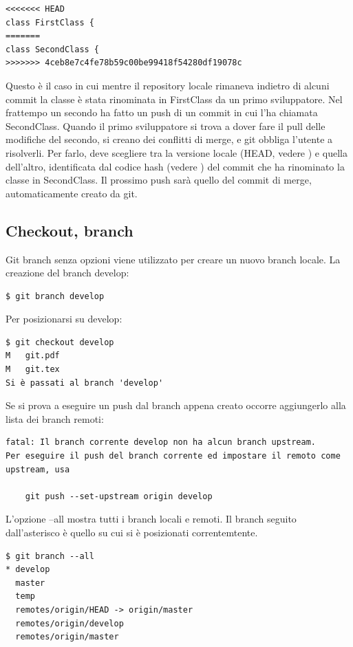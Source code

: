 \documentclass{article}
\begin{document}
\begin{verbatim}
<<<<<<< HEAD
class FirstClass {
=======
class SecondClass {
>>>>>>> 4ceb8e7c4fe78b59c00be99418f54280df19078c
\end{verbatim}

Questo è il caso in cui mentre il repository locale rimaneva indietro di alcuni
commit la classe è stata rinominata in FirstClass da un primo sviluppatore. Nel
frattempo un secondo ha fatto un push di un commit in cui l'ha chiamata
SecondClass. Quando il primo sviluppatore si trova a dover fare il pull delle modifiche del
secondo, si creano dei conflitti di merge, e git obbliga l'utente a risolverli.
Per farlo, deve scegliere tra la versione locale (HEAD, vedere ) e 
quella dell'altro, identificata dal codice hash (vedere ) del commit
che ha rinominato la classe in SecondClass.
Il prossimo push sarà quello del commit di merge, automaticamente creato da git.

\subsection{Checkout, branch}
Git branch senza opzioni viene utilizzato per creare un nuovo branch locale. La
creazione del branch develop:

\begin{verbatim}
$ git branch develop
\end{verbatim}

Per posizionarsi su develop:

\begin{verbatim}
$ git checkout develop
M	git.pdf
M	git.tex
Si è passati al branch 'develop'
\end{verbatim}

Se si prova a eseguire un push dal branch appena creato occorre
aggiungerlo alla lista dei branch remoti:

\begin{verbatim}
fatal: Il branch corrente develop non ha alcun branch upstream.
Per eseguire il push del branch corrente ed impostare il remoto come upstream, usa

    git push --set-upstream origin develop
\end{verbatim}

L'opzione --all mostra tutti i branch locali e remoti. Il branch seguito
dall'asterisco è quello su cui si è posizionati correntemtente.

\begin{verbatim}
$ git branch --all
* develop
  master
  temp
  remotes/origin/HEAD -> origin/master
  remotes/origin/develop
  remotes/origin/master
\end{verbatim}
\end{document}
